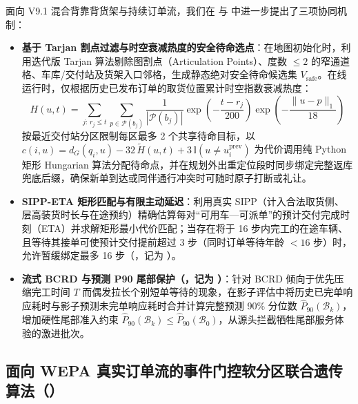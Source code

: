 面向 V9.1 混合背靠背货架与持续订单流，我们在  与  中进一步提出了三项协同机制：
\begin{itemize}
  \item \textbf{基于 Tarjan 割点过滤与时空衰减热度的安全待命选点}：在地图初始化时，利用迭代版 Tarjan 算法剔除图割点（Articulation Points）、度数 $\le 2$ 的窄通道格、车库/交付站及货架入口邻格，生成静态绝对安全待命候选集 $V_{\text{safe}}$。在线运行时，仅根据历史已发布订单的取货位置累计时空指数衰减热度：
  \begin{equation}
    H(u, t) = \sum_{j:\, r_j \le t} \sum_{p \in \mathcal{P}(b_j)} \frac{1}{|\mathcal{P}(b_j)|}\exp\!\left(-\frac{t - r_j}{200}\right)\exp\!\left(-\frac{\|u - p\|_1}{18}\right)
    \label{eq:heat-positioning}
  \end{equation}
  按最近交付站分区限制每区最多 2 个共享待命目标，以 $c(i, u) = d_G(q_i, u) - 32\,\tilde{H}(u, t) + 3\,\mathbb{I}(u \neq u_i^{\text{prev}})$ 为代价调用纯 Python 矩形 Hungarian 算法分配待命点，并在规划外出重定位段时同步绑定完整返库兜底后缀，确保新单到达或同伴通行冲突时可随时原子打断或礼让。
  \item \textbf{SIPP-ETA 矩形匹配与有限主动延迟}：利用真实 SIPP（计入合法取货侧、层高装货时长与在途预约）精确估算每对“可用车—可派单”的预计交付完成时刻（ETA）并求解矩形最小代价匹配；当存在将于 16 步内完工的在途车辆、且等待其接单可使预计交付提前超过 3 步（同时订单等待年龄 $<16$ 步）时，允许暂缓绑定最多 16 步（，记为 ）。
  \item \textbf{流式 BCRD 与预测 P90 尾部保护（，记为 ）}：针对 BCRD 倾向于优先压缩完工时间 $T$ 而偶发拉长个别短单等待的现象，在影子评估中将历史已完单响应耗时与影子预测未完单响应耗时合并计算完整预测 90\% 分位数 $\hat{P}_{90}(\mathcal{B}_k)$，增加硬性尾部准入约束 $\hat{P}_{90}(\mathcal{B}_k) \le \hat{P}_{90}(\mathcal{B}_0)$，从源头拦截牺牲尾部服务体验的激进批次。
\end{itemize}

\subsection{面向 WEPA 真实订单流的事件门控软分区联合遗传算法（）}

